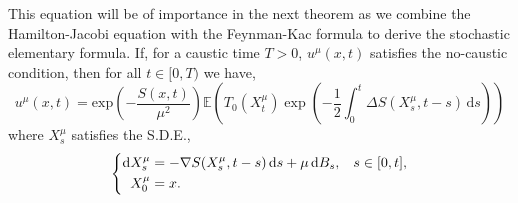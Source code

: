 \documentclass[a4paper,12pt,draft]{report}
\begin{document}
This equation will be of importance in the next theorem as we combine the Hamilton-Jacobi equation with the Feynman-Kac formula to derive the stochastic elementary formula.
\theorem
{
If, for a caustic time $T > 0$, $u^{\mu}(x, t)$ satisfies the no-caustic condition, then for all $t \in [0, T)$ we have,
\begin{equation}
u^\mu(x, t) = \mathrm{exp}\left(-\frac{S(x, t)}{\mu^2}\right)\mathbb{E}\left(T_{0}(X^{\mu}_{t})\exp\left(-\frac{1}{2}\int_0^t \Delta S(X^{\mu}_{s}, t - s)\,\mathrm{d}s\right)\right) \label{SEF}
\end{equation}
where $X^{\mu}_{s}$ satisfies the S.D.E.,
\begin{equation}
\left\{
\begin{aligned}
\mathrm{d}X^{\mu}_{s} & = -\nabla S(X^{\mu}_{s}, t - s)\,\mathrm{d}s + \mu\,\mathrm{d}B_{s}, \hspace{0.3cm} s \in [0, t], \\ \label{Diffusion}
\hspace{0.2cm}X^{\mu}_{0} & = x.
\end{aligned}
\right.
\end{equation}
}
\proof
\end{document}
